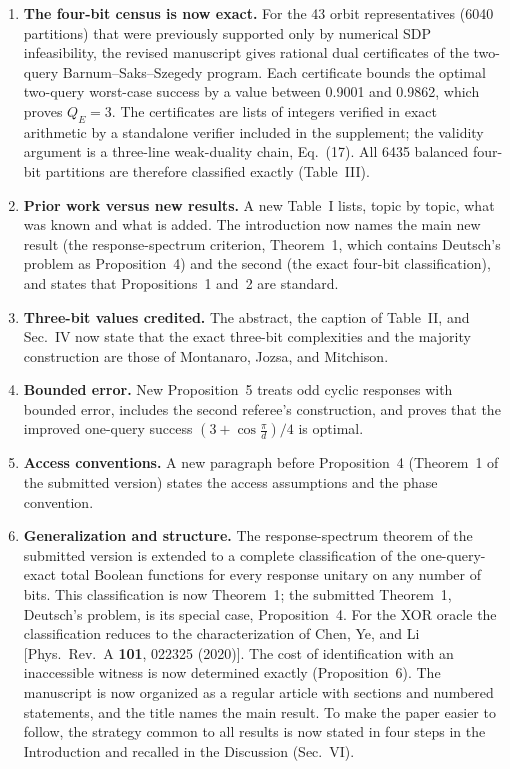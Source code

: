 \documentclass[11pt]{article}
\begin{document}
\begin{enumerate}[leftmargin=*]
\item \textbf{The four-bit census is now exact.} For the 43 orbit
representatives (6040 partitions) that were previously supported only by
numerical SDP infeasibility, the revised manuscript gives rational dual
certificates of the two-query Barnum--Saks--Szegedy program. Each certificate
bounds the optimal two-query worst-case success by a value between 0.9001 and
0.9862, which proves \(Q_E=3\). The certificates are lists of integers
verified in exact arithmetic by a standalone verifier included in the
supplement; the validity argument is a three-line weak-duality chain,
Eq.~(17). All 6435 balanced four-bit partitions are therefore classified
exactly (Table~III).
\item \textbf{Prior work versus new results.} A new Table~I lists, topic by
topic, what was known and what is added. The introduction now names the main
new result (the response-spectrum criterion, Theorem~1, which contains
Deutsch's problem as Proposition~4) and the second (the exact four-bit
classification), and states that Propositions~1 and~2 are standard.
\item \textbf{Three-bit values credited.} The abstract, the caption of
Table~II, and Sec.~IV now state that the exact three-bit complexities and the
majority construction are those of Montanaro, Jozsa, and Mitchison.
\item \textbf{Bounded error.} New Proposition~5 treats odd cyclic responses
with bounded error, includes the second referee's construction, and proves
that the improved one-query success \((3+\cos\frac{\pi}{d})/4\) is optimal.
\item \textbf{Access conventions.} A new paragraph before Proposition~4
(Theorem~1 of the submitted version) states the access assumptions and the
phase convention.
\item \textbf{Generalization and structure.} The response-spectrum theorem of
the submitted version is extended to a complete classification of the
one-query-exact total Boolean functions for every response unitary on any
number of bits. This classification is now Theorem~1; the submitted
Theorem~1, Deutsch's problem, is its special case, Proposition~4. For the XOR
oracle the classification reduces to the characterization of Chen, Ye, and Li
[Phys.\ Rev.\ A \textbf{101}, 022325 (2020)]. The cost of
identification with an inaccessible witness is now determined exactly
(Proposition~6). The manuscript is now organized as a regular article with sections
and numbered statements, and the title names the main result. To make the
paper easier to follow, the strategy common to all results is now stated in
four steps in the Introduction and recalled in the Discussion (Sec.~VI).
\end{enumerate}
\end{document}
